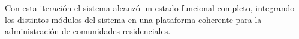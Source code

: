 Con esta iteración el sistema alcanzó un estado funcional completo, integrando los distintos módulos del sistema en una plataforma coherente para la administración de comunidades residenciales.





